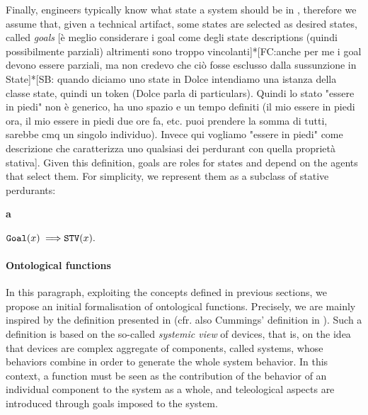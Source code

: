 \documentclass[sw]{iosart2x}
\newcommand{\bflist}{\begin{list}{}{\setlength{\topsep}{2mm}\setlength{\partopsep}{0mm}\setlength{\parsep}{0mm}\setlength{\leftmargin}{9mm}\setlength{\labelwidth}{8mm}}}
\newcommand{\eflist}{\end{list}}
\newcommand{\AxLabel}{\textrm{a}}
\newcounter{cntax}
\newcommand{\myax}[1]{\refstepcounter{cntax}\begin{small}{\bf \AxLabel\thecntax\label{ax:#1}}\end{small}}
\newcommand{\generalStyle}[1]{\texttt{#1}}
\newcommand{\uniRel}[2]{\generalStyle{#1}(#2)}
\newcommand{\myfi}{\hspace{0.9mm} \Longrightarrow}
\newcommand{\DOLCEStative}[1]{\uniRel{{STV}}{#1}}
\newcommand{\Goal}[1]{\uniRel{Goal}{#1}}
\newcommand{\firstTimeKeyWord}[1]{\textit{#1}}
\newcommand{\stateVarCond}[1]{%
  \ifthenelse{\equal{#1}{fullSingular}}{system condition}{%
    \ifthenelse{\equal{#1}{shortSingular}}{condition}{%
      \ifthenelse{\equal{#1}{fullPlural}}{system conditions}{%
        \ifthenelse{\equal{#1}{shortPlural}}{conditions}{%
          ERROR!%
        }%
      }%
    }%
  }%
}
\newcommand{\TODO}[1]{{\color{red} #1}}
\newcommand{\myComment}[1]{}
\begin{document}
Finally, engineers typically know what state a system should be in%
, therefore we assume that, given a technical artifact, some states are selected as desired states, called \firstTimeKeyWord{goals}\TODO{[è meglio considerare i goal come degli state descriptions (quindi possibilmente parziali) altrimenti sono troppo vincolanti]*[FC:anche per me i goal devono essere parziali, ma non credevo che ciò fosse esclusso dalla sussunzione in State]*[SB: quando diciamo uno state in Dolce intendiamo una istanza della classe state, quindi un token (Dolce parla di particulars). Quindi lo stato "essere in piedi" non è generico, ha uno spazio e un tempo definiti (il mio essere in piedi ora, il mio essere in piedi due ore fa, etc. puoi prendere la somma di tutti, sarebbe cmq un singolo individuo). Invece qui vogliamo "essere in piedi" come descrizione che caratterizza uno qualsiasi dei perdurant con quella proprietà stativa]}.
Given this definition, goals are roles for states and depend on the agents that select them.
For simplicity, we represent them as a subclass of stative perdurants: 
\bflist
  \item[\myax{goalSubsum}] $ \Goal{x} \myfi \DOLCEStative{x}. $
\eflist




\paragraph{Ontological functions}
In this paragraph, exploiting the concepts defined in previous sections, we propose an initial formalisation of ontological functions. 
Precisely, we are mainly inspired by the definition presented in \cite{mizoguchiUnifyingDefinitionArtifact2016} (cfr. also Cummings' definition in \cite{cumminsFunctionalAnalysis1975}).
Such a definition is based on the so-called \firstTimeKeyWord{systemic view} of devices, that is, on the idea that devices are complex aggregate of components, called systems, whose behaviors combine in order to generate the whole system behavior. 
In this context, a function must be seen as the contribution of the behavior of an individual component to the system as a whole, and teleological aspects are introduced through goals imposed to \myComment{selected for} the system.  
\end{document}

